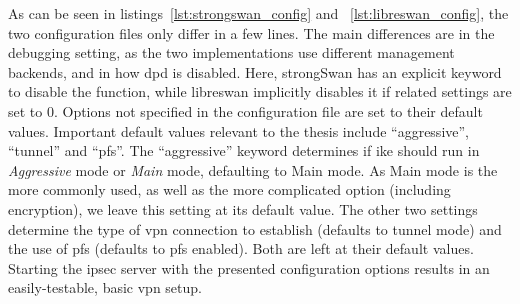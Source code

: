 As can be seen in listings~\ref{lst:strongswan_config} and ~\ref{lst:libreswan_config}, the two configuration files only differ in a few lines. The main differences are in the debugging setting, as the two implementations use different management backends, and in how \ac{dpd} is disabled. Here, strongSwan has an explicit keyword to disable the function, while libreswan implicitly disables it if related settings are set to 0. Options not specified in the configuration file are set to their default values. Important default values relevant to the thesis include ``aggressive'', ``tunnel'' and ``pfs''. The ``aggressive'' keyword determines if \ac{ike} should run in \emph{Aggressive} mode or \emph{Main} mode, defaulting to Main mode. As Main mode is the more commonly used, as well as the more complicated option (including encryption), we leave this setting at its default value. The other two settings determine the type of \ac{vpn} connection to establish (defaults to tunnel mode) and the use of \ac{pfs} (defaults to \ac{pfs} enabled). Both are left at their default values. Starting the \ac{ipsec} server with the presented configuration options results in an easily-testable, basic \ac{vpn} setup.



